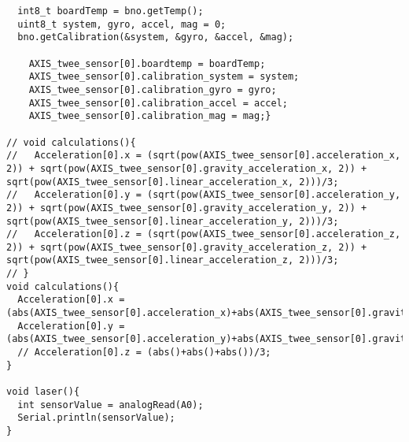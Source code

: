 \begin{lstlisting}
  int8_t boardTemp = bno.getTemp();
  uint8_t system, gyro, accel, mag = 0;
  bno.getCalibration(&system, &gyro, &accel, &mag);

    AXIS_twee_sensor[0].boardtemp = boardTemp;
    AXIS_twee_sensor[0].calibration_system = system;
    AXIS_twee_sensor[0].calibration_gyro = gyro;
    AXIS_twee_sensor[0].calibration_accel = accel;
    AXIS_twee_sensor[0].calibration_mag = mag;}

// void calculations(){
//   Acceleration[0].x = (sqrt(pow(AXIS_twee_sensor[0].acceleration_x, 2)) + sqrt(pow(AXIS_twee_sensor[0].gravity_acceleration_x, 2)) + sqrt(pow(AXIS_twee_sensor[0].linear_acceleration_x, 2)))/3;
//   Acceleration[0].y = (sqrt(pow(AXIS_twee_sensor[0].acceleration_y, 2)) + sqrt(pow(AXIS_twee_sensor[0].gravity_acceleration_y, 2)) + sqrt(pow(AXIS_twee_sensor[0].linear_acceleration_y, 2)))/3;
//   Acceleration[0].z = (sqrt(pow(AXIS_twee_sensor[0].acceleration_z, 2)) + sqrt(pow(AXIS_twee_sensor[0].gravity_acceleration_z, 2)) + sqrt(pow(AXIS_twee_sensor[0].linear_acceleration_z, 2)))/3;
// }
void calculations(){
  Acceleration[0].x = (abs(AXIS_twee_sensor[0].acceleration_x)+abs(AXIS_twee_sensor[0].gravity_acceleration_x)+abs(AXIS_twee_sensor[0].linear_acceleration_x))/3;
  Acceleration[0].y = (abs(AXIS_twee_sensor[0].acceleration_y)+abs(AXIS_twee_sensor[0].gravity_acceleration_y)+abs(AXIS_twee_sensor[0].linear_acceleration_y))/3;
  // Acceleration[0].z = (abs()+abs()+abs())/3;
}

void laser(){
  int sensorValue = analogRead(A0);
  Serial.println(sensorValue);
}
\end{lstlisting}
